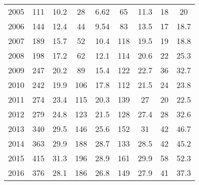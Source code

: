 \begin{table}[htbp]
\begin{tabular}{l*{8}{c}}
2005      &      111&     10.2&       28&     6.62&       65&     11.3&       18&       20\\
2006      &      144&     12.4&       44&     9.54&       83&     13.5&       17&     18.7\\
2007      &      189&     15.7&       52&     10.4&      118&     19.5&       19&     18.8\\
2008      &      198&     17.2&       62&     12.1&      114&     20.6&       22&     25.3\\
2009      &      247&     20.2&       89&     15.4&      122&     22.7&       36&     32.7\\
2010      &      242&     19.9&      106&     17.8&      112&     21.5&       24&     23.8\\
2011      &      274&     23.4&      115&     20.3&      139&       27&       20&     22.5\\
2012      &      279&     24.8&      123&     21.5&      128&     27.4&       28&     32.6\\
2013      &      340&     29.5&      146&     25.6&      152&       31&       42&     46.7\\
2014      &      363&     29.9&      188&     28.7&      133&     28.5&       42&     45.2\\
2015      &      415&     31.3&      196&     28.9&      161&     29.9&       58&     52.3\\
2016      &      376&     28.1&      186&     26.8&      149&     27.9&       41&     37.3\\
\hline\hline
\end{tabular}
\end{table}
